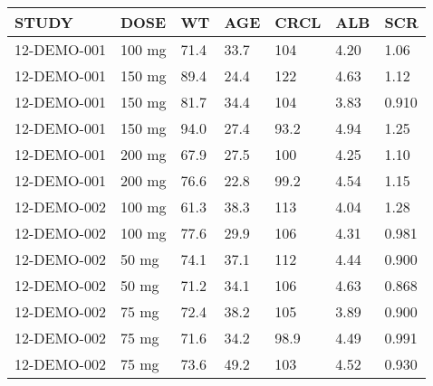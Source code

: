 {\def\arraystretch{1.4}\tabcolsep=5pt
\begin{threeparttable}
\begin{tabular}[h]{lllllll}
\hline
STUDY & DOSE & WT & AGE & CRCL & ALB & SCR \\
\hline
12-DEMO-001 & 100 mg & 71.4 & 33.7 & 104 & 4.20 & 1.06 \\
12-DEMO-001 & 150 mg & 89.4 & 24.4 & 122 & 4.63 & 1.12 \\
12-DEMO-001 & 150 mg & 81.7 & 34.4 & 104 & 3.83 & 0.910 \\
12-DEMO-001 & 150 mg & 94.0 & 27.4 & 93.2 & 4.94 & 1.25 \\
12-DEMO-001 & 200 mg & 67.9 & 27.5 & 100 & 4.25 & 1.10 \\
12-DEMO-001 & 200 mg & 76.6 & 22.8 & 99.2 & 4.54 & 1.15 \\ \hline
12-DEMO-002 & 100 mg & 61.3 & 38.3 & 113 & 4.04 & 1.28 \\
12-DEMO-002 & 100 mg & 77.6 & 29.9 & 106 & 4.31 & 0.981 \\
12-DEMO-002 & 50 mg & 74.1 & 37.1 & 112 & 4.44 & 0.900 \\
12-DEMO-002 & 50 mg & 71.2 & 34.1 & 106 & 4.63 & 0.868 \\
12-DEMO-002 & 75 mg & 72.4 & 38.2 & 105 & 3.89 & 0.900 \\
12-DEMO-002 & 75 mg & 71.6 & 34.2 & 98.9 & 4.49 & 0.991 \\
12-DEMO-002 & 75 mg & 73.6 & 49.2 & 103 & 4.52 & 0.930 \\
\hline
\end{tabular}
\end{threeparttable}
}
